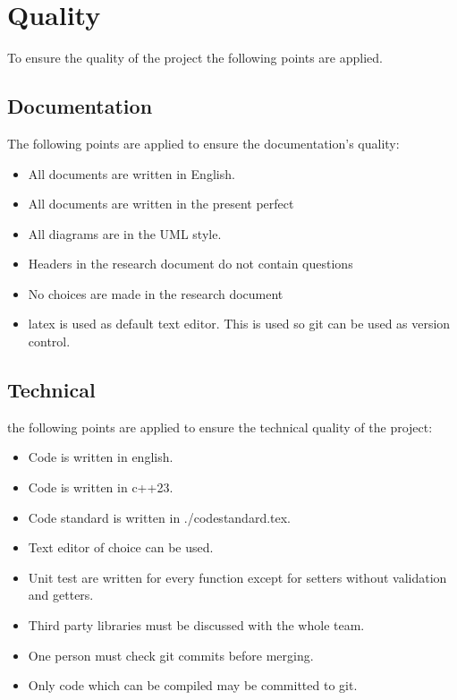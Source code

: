 \documentclass{article} %
\begin{document}
\newpage

\section{Quality}
To ensure the quality of the project the following points are applied.
\subsection{Documentation}
The following points are applied to ensure the documentation’s quality:
\begin{itemize}
    \item All documents are written in English.
    \item All documents are written in the present perfect
    \item All diagrams are in the UML style.
    \item Headers in the research document do not contain questions
    \item No choices are made in the research document
    \item latex is used as default text editor. This is used so git can be used as version control.
\end{itemize}
\subsection{Technical}
the following points are applied to ensure the technical quality of the project:
\begin{itemize}
    \item Code is written in english.
    \item Code is written in c++23.
    \item Code standard is written in ./codestandard.tex.
    \item Text editor of choice can be used.
    \item Unit test are written for every function except for setters without validation and getters.
    \item Third party libraries must be discussed with the whole team.
    \item One person must check git commits before merging.
    \item Only code which can be compiled may be committed to git.
\end{itemize}
\end{document}
